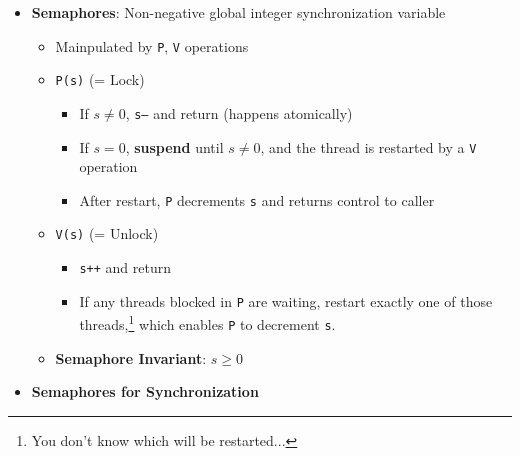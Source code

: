 \documentclass[12pt]{article}
\begin{document}
{\begin{itemize}
\begin{itemize}
				\item Each point: Possible \textit{execution state}
				\item Trajectory: is a sequence of legal state \textit{transitions} of possible concurrent execution (one set of interleaving)
				\item \textbf{Critical Section} (w.r.t a shared var): load $\sim$ store instruction
				\item Instructions in critical section should not be interleaved
				\item \textbf{Unsafe Region}: Intersection of critical sections
				\item Trajectory is \textit{safe} $\iff$ does not pass unsafe region
				\item Enforce \textbf{mutual exclusion} to \textbf{synchronize} the execution of threads so that they can never have an unsafe trajectory
			\end{itemize}
			\item \textbf{Semaphores}: Non-negative global integer synchronization variable
			\begin{itemize}
				\item Mainpulated by \texttt{P}, \texttt{V} operations
				\item \texttt{P(s)} (= Lock)
				\begin{itemize}
					\item If $s\neq 0$, \texttt{s--} and return (happens atomically)
					\item If $s=0$, \textbf{suspend} until $s\neq 0$, and the thread is restarted by a \texttt{V} operation
					\item After restart, \texttt{P} decrements \texttt{s} and returns control to caller
				\end{itemize}
				\item \texttt{V(s)} (= Unlock)
				\begin{itemize}
					\item \texttt{s++} and return
					\item If any threads blocked in \texttt{P} are waiting, restart exactly one of those threads,\footnote{You don't know which will be restarted...} which enables \texttt{P} to decrement \texttt{s}.
				\end{itemize}
				\item \textbf{Semaphore Invariant}: $s\geq 0$
			\end{itemize}
			\item \textbf{Semaphores for Synchronization}
			\begin{itemize}

\end{itemize}
\end{itemize}}
\end{document}

